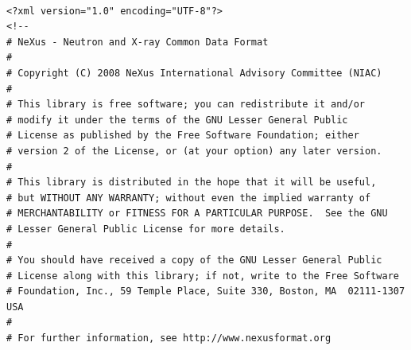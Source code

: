 \documentclass[a4paper]{article}\usepackage[dvips]{graphicx}
\begin{document}
\begin{verbatim}

<?xml version="1.0" encoding="UTF-8"?>
<!--
# NeXus - Neutron and X-ray Common Data Format
# 
# Copyright (C) 2008 NeXus International Advisory Committee (NIAC)
# 
# This library is free software; you can redistribute it and/or
# modify it under the terms of the GNU Lesser General Public
# License as published by the Free Software Foundation; either
# version 2 of the License, or (at your option) any later version.
#
# This library is distributed in the hope that it will be useful,
# but WITHOUT ANY WARRANTY; without even the implied warranty of
# MERCHANTABILITY or FITNESS FOR A PARTICULAR PURPOSE.  See the GNU
# Lesser General Public License for more details.
#
# You should have received a copy of the GNU Lesser General Public
# License along with this library; if not, write to the Free Software
# Foundation, Inc., 59 Temple Place, Suite 330, Boston, MA  02111-1307  USA
#
# For further information, see http://www.nexusformat.org


\end{verbatim}
\end{document}
